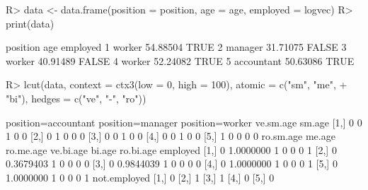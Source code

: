 \begin{Schunk}
% --begin: "lcut.data.frame"
\begin{Sinput}
R> data <- data.frame(position = position, age = age, employed = logvec)
R> print(data)
\end{Sinput}
\begin{Soutput}
    position      age employed
1     worker 54.88504     TRUE
2    manager 31.71075    FALSE
3     worker 40.91489    FALSE
4     worker 52.24082     TRUE
5 accountant 50.63086     TRUE
\end{Soutput}
\begin{Sinput}
R> lcut(data, context = ctx3(low = 0, high = 100), atomic = c("sm", "me", 
+     "bi"), hedges = c("ve", "-", "ro"))
\end{Sinput}
\begin{Soutput}
     position=accountant position=manager position=worker ve.sm.age sm.age
[1,]                   0                0               1         0      0
[2,]                   0                1               0         0      0
[3,]                   0                0               1         0      0
[4,]                   0                0               1         0      0
[5,]                   1                0               0         0      0
     ro.sm.age    me.age ro.me.age ve.bi.age bi.age ro.bi.age employed
[1,]         0 1.0000000         1         0      0         0        1
[2,]         0 0.3679403         1         0      0         0        0
[3,]         0 0.9844039         1         0      0         0        0
[4,]         0 1.0000000         1         0      0         0        1
[5,]         0 1.0000000         1         0      0         0        1
     not.employed
[1,]            0
[2,]            1
[3,]            1
[4,]            0
[5,]            0
\end{Soutput}
%
% --end: "lcut.data.frame"
\end{Schunk}
